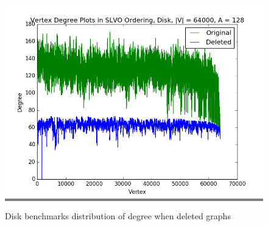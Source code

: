 \documentclass{article}
\begin{document}
\begin{figure}
\begin{minipage}{0.45\textwidth}
    \colorbox{gray}{\includegraphics[width=\linewidth]{./graphs/hist_deg_del_disk_2.png}}
    \end{minipage}

    \caption{Disk benchmarks distribution of degree when deleted graphs}
    \label{diskdegdelhists}
\end{figure}
\end{document}
